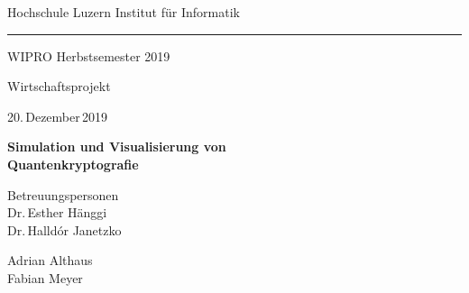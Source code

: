 \documentclass[a4paper,10.2pt,pdftex]{scrartcl}%
\begin{document}
\begin{titlepage} 
 \begin{center} 
    \thispagestyle{empty}
  {\small  Hochschule Luzern \hfill Institut für Informatik   \\[.75ex]
\hrule 
\vspace{0.75ex}
WIPRO  \hfill Herbstsemester 2019\\  

}


\vspace{14ex}



{\LARGE Wirtschaftsprojekt}


\vspace{2ex}

{\large 20.\,Dezember\,2019}\\
\vspace{2ex}



\vspace{9ex}


{\huge\bfseries\textsf{Simulation und Visualisierung von \\[-1mm] Quantenkryptografie \\[5.5mm] }}



\vspace{5ex}

Betreuungspersonen \\[2mm] Dr.\,Esther Hänggi \\ Dr.\,Halldór Janetzko\\[3mm]


\vspace{8ex}

{\Large Adrian Althaus \\[2mm] Fabian Meyer  \Large {}}

\vspace{8ex}


 

\end{center}
\end{titlepage}
\end{document}
